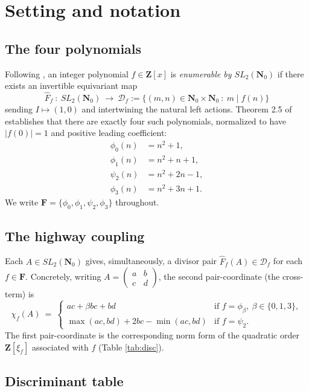 \documentclass[11pt]{article}
\theoremstyle{definition}
\newcommand{\Nz}{\mathbf{N}_0}
\newcommand{\Z}{\mathbf{Z}}
\newcommand{\F}{\mathbf{F}}
\newcommand{\SLNz}{SL_2(\Nz)}
\newcommand{\Df}{\mathcal{D}_f}
\newcommand{\Ff}{\hat{F}_f}
\newcommand{\F}{\mathcal{F}}
\begin{document}
\section{Setting and notation}\label{sec:setup}

\subsection{The four polynomials}

Following \cite{shakov}, an integer polynomial $f\in\Z[x]$ is \emph{enumerable by $\SLNz$} if there exists an invertible equivariant map
\[
\Ff\ :\ \SLNz\ \longrightarrow\ \Df := \{(m,n)\in\Nz\times\Nz\ :\ m\mid f(n)\}
\]
sending $I\mapsto(1,0)$ and intertwining the natural left actions. Theorem 2.5 of \cite{shakov} establishes that there are exactly four such polynomials, normalized to have $|f(0)|=1$ and positive leading coefficient:
\begin{align*}
\phi_0(n)&=n^2+1,\\
\phi_1(n)&=n^2+n+1,\\
\psi_2(n)&=n^2+2n-1,\\
\phi_3(n)&=n^2+3n+1.
\end{align*}
We write $\F=\{\phi_0,\phi_1,\psi_2,\phi_3\}$ throughout.

\subsection{The highway coupling}

Each $A\in\SLNz$ gives, simultaneously, a divisor pair $\Ff(A)\in\Df$ for each $f\in\F$. Concretely, writing $A=\begin{pmatrix}a&b\\c&d\end{pmatrix}$, the second pair-coordinate (the cross-term) is
\[
\chi_f(A)\ =\ \begin{cases}
ac+\beta bc + bd & \text{if }f=\phi_\beta,\ \beta\in\{0,1,3\},\\
\max(ac,bd)+2bc-\min(ac,bd) & \text{if }f=\psi_2.
\end{cases}
\]
The first pair-coordinate is the corresponding norm form of the quadratic order $\Z[\xi_f]$ associated with $f$ (Table \ref{tab:disc}).

\subsection{Discriminant table}
\end{document}
